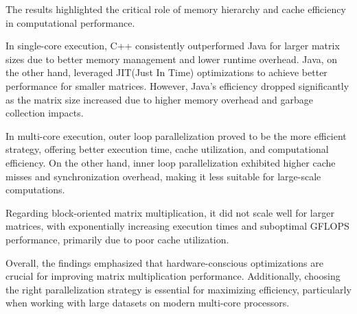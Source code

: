 \documentclass{article}
\begin{document}
 \par The results highlighted the critical role of memory hierarchy and cache efficiency in computational performance.\par In single-core execution, C++ consistently outperformed Java for larger matrix sizes due to better memory management and lower runtime overhead. Java, on the other hand, leveraged JIT(Just In Time) optimizations to achieve better performance for smaller matrices. However, Java's efficiency dropped significantly as the matrix size increased due to higher memory overhead and garbage collection impacts. \par In multi-core execution, outer loop parallelization proved to be the more efficient strategy, offering better execution time, cache utilization, and computational efficiency. On the other hand, inner loop parallelization exhibited higher cache misses and synchronization overhead, making it less suitable for large-scale computations.\par Regarding block-oriented matrix multiplication, it did not scale well for larger matrices, with exponentially increasing execution times and suboptimal GFLOPS performance, primarily due to poor cache utilization. \par Overall, the findings emphasized that hardware-conscious optimizations are crucial for improving matrix multiplication performance. Additionally, choosing the right parallelization strategy is essential for maximizing efficiency, particularly when working with large datasets on modern multi-core processors.
\end{document}
